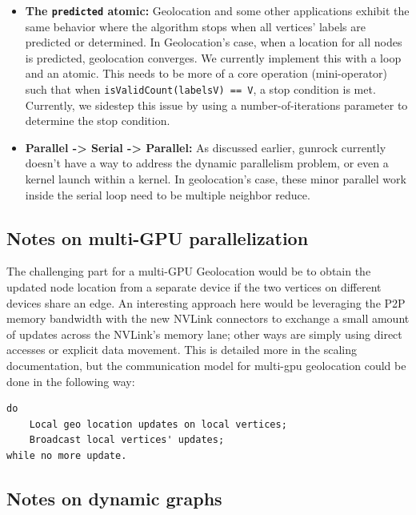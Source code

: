 \documentclass[10pt,oneside]{memoir}
\begin{document}
\begin{itemize}
\item
  \textbf{The \texttt{predicted} atomic:} Geolocation and some other
  applications exhibit the same behavior where the algorithm stops when
  all vertices' labels are predicted or determined. In Geolocation's
  case, when a location for all nodes is predicted, geolocation
  converges. We currently implement this with a loop and an atomic. This
  needs to be more of a core operation (mini-operator) such that when
  \texttt{isValidCount(labels\textbar{}V\textbar{})\ ==\ \textbar{}V\textbar{}},
  a stop condition is met. Currently, we sidestep this issue by using a
  number-of-iterations parameter to determine the stop condition.
\item
  \textbf{Parallel -\textgreater{} Serial -\textgreater{} Parallel:} As
  discussed earlier, gunrock currently doesn't have a way to address the
  dynamic parallelism problem, or even a kernel launch within a kernel.
  In geolocation's case, these minor parallel work inside the serial
  loop need to be multiple neighbor reduce.
\end{itemize}

\hypertarget{notes-on-multi-gpu-parallelization-1}{%
\subsection{Notes on multi-GPU
parallelization}\label{notes-on-multi-gpu-parallelization-1}}

The challenging part for a multi-GPU Geolocation would be to obtain the
updated node location from a separate device if the two vertices on
different devices share an edge. An interesting approach here would be
leveraging the P2P memory bandwidth with the new NVLink connectors to
exchange a small amount of updates across the NVLink's memory lane;
other ways are simply using direct accesses or explicit data movement.
This is detailed more in the scaling documentation, but the
communication model for multi-gpu geolocation could be done in the
following way:

\begin{verbatim}
do
    Local geo location updates on local vertices;
    Broadcast local vertices' updates;
while no more update.
\end{verbatim}

\hypertarget{notes-on-dynamic-graphs-1}{%
\subsection{Notes on dynamic graphs}\label{notes-on-dynamic-graphs-1}}
\end{document}

